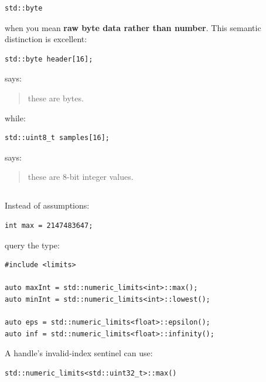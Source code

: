\begin{verbatim}
std::byte
\end{verbatim}

when you mean \textbf{raw byte data rather than number}. This semantic distinction is excellent:

\begin{verbatim}
std::byte header[16];
\end{verbatim}

says:

\begin{quote}
these are bytes.
\end{quote}

while:

\begin{verbatim}
std::uint8_t samples[16];
\end{verbatim}

says:

\begin{quote}
these are 8-bit integer values.
\end{quote}

\subsection{\texorpdfstring{}{}}\label{05-engine-i-ch002-numeric_limits}

\hypertarget{05-engine-i-ch002-numeric_limits}{}

Instead of assumptions:

\begin{verbatim}
int max = 2147483647;
\end{verbatim}

query the type:

\begin{verbatim}
#include <limits>

auto maxInt = std::numeric_limits<int>::max();
auto minInt = std::numeric_limits<int>::lowest();

auto eps = std::numeric_limits<float>::epsilon();
auto inf = std::numeric_limits<float>::infinity();
\end{verbatim}

A handle's invalid-index sentinel can use:

\begin{verbatim}
std::numeric_limits<std::uint32_t>::max()
\end{verbatim}

